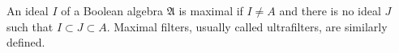 An ideal $I$ of a Boolean algebra $\mathfrak{A}$ is maximal if $I \neq A$ and there is no ideal $J$ such that $I \subset J \subset A$. Maximal filters, usually called ultrafilters, are similarly defined.
